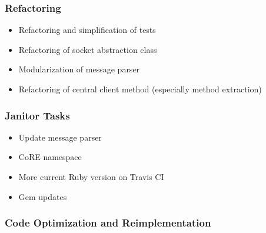 	\begin{multicols}{2}
		\subsubsection{Refactoring}

			\begin{itemize}
				\item Refactoring and simplification of tests
				\item Refactoring of socket abstraction class
				\item Modularization of message parser
				\item Refactoring of central client method (especially method
					extraction)
			\end{itemize}

		\subsubsection{Janitor Tasks}

			\begin{itemize}
				\item Update message parser
				\item \ac{CoRE} namespace
				\item More current Ruby version on Travis CI
				\item Gem updates
			\end{itemize}

		\subsubsection{Code Optimization and Reimplementation}


\end{multicols}
